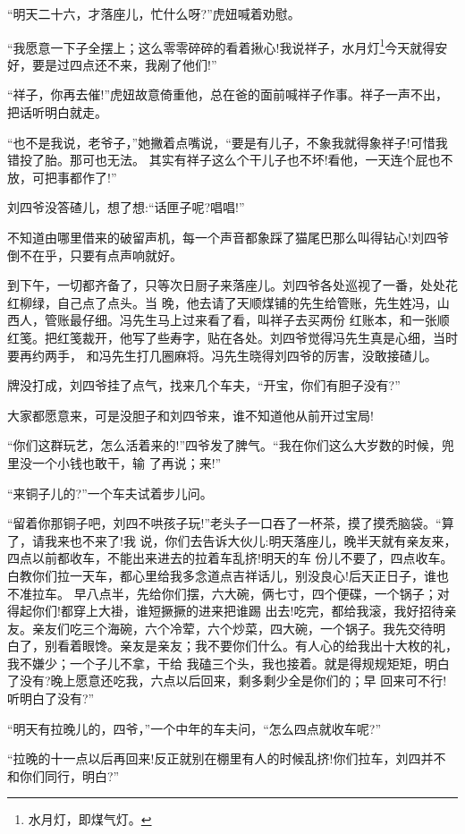 \documentclass[11pt,a4paper,onecolumn]{article}
\begin{document}
``明天二十六，才落座儿，忙什么呀?''虎妞喊着劝慰。

``我愿意一下子全摆上；这么零零碎碎的看着揪心!我说祥子，水月灯\footnote{水月灯，即煤气灯。}今天就得安
好，要是过四点还不来，我剐了他们!''

``祥子，你再去催!''虎妞故意倚重他，总在爸的面前喊祥子作事。祥子一声不出，把话听明白就走。

``也不是我说，老爷子，''她撇着点嘴说，``要是有儿子，不象我就得象祥子!可惜我错投了胎。那可也无法。
其实有祥子这么个干儿子也不坏!看他，一天连个屁也不放，可把事都作了!''

刘四爷没答碴儿，想了想:``话匣子呢?唱唱!''

不知道由哪里借来的破留声机，每一个声音都象踩了猫尾巴那么叫得钻心!刘四爷倒不在乎，只要有点声响就好。

到下午，一切都齐备了，只等次日厨子来落座儿。刘四爷各处巡视了一番，处处花红柳绿，自己点了点头。当
晚，他去请了天顺煤铺的先生给管账，先生姓冯，山西人，管账最仔细。冯先生马上过来看了看，叫祥子去买两份
红账本，和一张顺红笺。把红笺裁开，他写了些寿字，贴在各处。刘四爷觉得冯先生真是心细，当时要再约两手，
和冯先生打几圈麻将。冯先生晓得刘四爷的厉害，没敢接碴儿。

牌没打成，刘四爷挂了点气，找来几个车夫，``开宝，你们有胆子没有?''

大家都愿意来，可是没胆子和刘四爷来，谁不知道他从前开过宝局!

``你们这群玩艺，怎么活着来的!''四爷发了脾气。``我在你们这么大岁数的时候，兜里没一个小钱也敢干，输
了再说；来!''

``来铜子儿的?''一个车夫试着步儿问。

``留着你那铜子吧，刘四不哄孩子玩!''老头子一口吞了一杯茶，摸了摸秃脑袋。``算了，请我来也不来了!我
说，你们去告诉大伙儿:明天落座儿，晚半天就有亲友来，四点以前都收车，不能出来进去的拉着车乱挤!明天的车
份儿不要了，四点收车。白教你们拉一天车，都心里给我多念道点吉祥话儿，别没良心!后天正日子，谁也不准拉车。
早八点半，先给你们摆，六大碗，俩七寸，四个便碟，一个锅子；对得起你们!都穿上大褂，谁短撅撅的进来把谁踢
出去!吃完，都给我滚，我好招待亲友。亲友们吃三个海碗，六个冷荤，六个炒菜，四大碗，一个锅子。我先交待明
白了，别看着眼馋。亲友是亲友；我不要你们什么。有人心的给我出十大枚的礼，我不嫌少；一个子儿不拿，干给
我磕三个头，我也接着。就是得规规矩矩，明白了没有?晚上愿意还吃我，六点以后回来，剩多剩少全是你们的；早
回来可不行!听明白了没有?''

``明天有拉晚儿的，四爷，''一个中年的车夫问，``怎么四点就收车呢?''

``拉晚的十一点以后再回来!反正就别在棚里有人的时候乱挤!你们拉车，刘四并不和你们同行，明白?''
\end{document}
